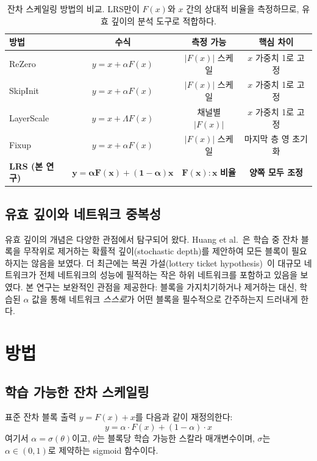 \documentclass[preprint,12pt]{elsarticle}
\begin{document}
\begin{table}[t]
\centering
\caption{잔차 스케일링 방법의 비교. LRS만이 $F(x)$와 $x$ 간의 상대적 비율을 측정하므로, 유효 깊이의 분석 도구로 적합하다.}
\label{tab:comparison}
\begin{tabular}{lccc}
\toprule
\textbf{방법} & \textbf{수식} & \textbf{측정 가능} & \textbf{핵심 차이} \\
\midrule
ReZero & $y = x + \alpha F(x)$ & $|F(x)|$ 스케일 & $x$ 가중치 1로 고정 \\
SkipInit & $y = x + \alpha F(x)$ & $|F(x)|$ 스케일 & $x$ 가중치 1로 고정 \\
LayerScale & $y = x + \Lambda F(x)$ & 채널별 $|F(x)|$ & $x$ 가중치 1로 고정 \\
Fixup & $y = x + \alpha F(x)$ & $|F(x)|$ 스케일 & 마지막 층 영 초기화 \\
\textbf{LRS (본 연구)} & $\mathbf{y = \alpha F(x) + (1{-}\alpha)x}$ & $\mathbf{F(x):x}$ \textbf{비율} & \textbf{양쪽 모두 조정} \\
\bottomrule
\end{tabular}
\end{table}

\subsection{유효 깊이와 네트워크 중복성}

유효 깊이의 개념은 다양한 관점에서 탐구되어 왔다. Huang et al.~\cite{huang2016deep}은 학습 중 잔차 블록을 무작위로 제거하는 확률적 깊이(stochastic depth)를 제안하여 모든 블록이 필요하지는 않음을 보였다. 더 최근에는 복권 가설(lottery ticket hypothesis)~\cite{frankle2019lottery}이 대규모 네트워크가 전체 네트워크의 성능에 필적하는 작은 하위 네트워크를 포함하고 있음을 보였다. 본 연구는 보완적인 관점을 제공한다: 블록을 가지치기하거나 제거하는 대신, 학습된 $\alpha$ 값을 통해 네트워크 \emph{스스로}가 어떤 블록을 필수적으로 간주하는지 드러내게 한다.

\section{방법}
\label{sec:method}

\subsection{학습 가능한 잔차 스케일링}

표준 잔차 블록 출력 $y = F(x) + x$를 다음과 같이 재정의한다:
\begin{equation}
    y = \alpha \cdot F(x) + (1 - \alpha) \cdot x
    \label{eq:lrs}
\end{equation}
여기서 $\alpha = \sigma(\theta)$이고, $\theta$는 블록당 학습 가능한 스칼라 매개변수이며, $\sigma$는 $\alpha \in (0, 1)$로 제약하는 sigmoid 함수이다.
\end{document}
